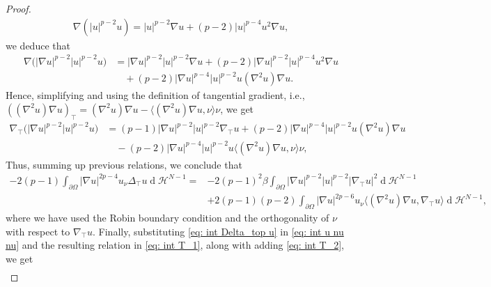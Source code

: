 \documentclass[10pt,a4paper]{amsart}
\numberwithin{equation}{section}
\renewcommand{\d}[1]{\ensuremath{\operatorname{d}\!{#1}}}
\begin{document}
\begin{proof}
\begin{equation*}
\begin{split}
        \nabla (|u|^{p-2} u) = |u|^{p-2} \nabla u + (p-2) |u|^{p-4} u^2 \nabla u,
    \end{split}
    \end{equation*}
    we deduce that
    \begin{equation*}
    \begin{split}
        \nabla \Big(|\nabla u|^{p-2} |u|^{p-2} u \Big) &= |\nabla u|^{p-2} |u|^{p-2} \nabla u + (p-2) |\nabla u|^{p-2} |u|^{p-4} u^2 \nabla u 
        \\
        &\quad+ (p-2) |\nabla u|^{p-4} |u|^{p-2} u (\nabla^2 u) \nabla u.
    \end{split}
    \end{equation*}
    Hence, simplifying and using the definition of tangential gradient, i.e., $((\nabla^2 u) \nabla u)_\top = (\nabla^2 u) \nabla u - \langle(\nabla^2 u) \nabla u,\nu\rangle \nu$, we get 
    \begin{equation*}
    \begin{split}
        \nabla_\top \Big(|\nabla u|^{p-2} |u|^{p-2} u \Big) &= (p-1) |\nabla u|^{p-2} |u|^{p-2} \nabla_\top u 
         + (p-2) |\nabla u|^{p-4} |u|^{p-2} u (\nabla^2 u) \nabla u 
         \\
        &\quad
         - (p-2) |\nabla u|^{p-4} |u|^{p-2} u \langle(\nabla^2 u) \nabla u,\nu\rangle \nu,
    \end{split}
    \end{equation*}
    Thus, summing up previous relations, we conclude that 
    \begin{equation}\label{eq: int Delta_top u}
        \begin{aligned}
        -2(p-1) \int_{\partial\Omega}|\nabla u|^{2p-4} u_\nu \Delta_\top u \d{}\mathcal{H}^{N-1} =
        &-2(p-1)^2\beta\int_{\partial\Omega}|\nabla u|^{p-2}|u|^{p-2}|\nabla_\top u|^2\d{}\mathcal{H}^{N-1}\\
        &+2(p-1)(p-2)\int_{\partial\Omega}|\nabla u|^{2p-6} u_\nu \langle(\nabla^2u)\nabla u,\nabla_\top u\rangle\d{}\mathcal{H}^{N-1},
        \end{aligned}
    \end{equation}
    where we have used the Robin boundary condition and the orthogonality of $\nu$ with respect to $\nabla_\top u$.
    Finally, substituting \eqref{eq: int Delta_top u} in \eqref{eq: int u nu nu} and the resulting relation in \eqref{eq: int T_1}, along with adding \eqref{eq: int T_2}, we get
    \begin{equation*}
        \begin{aligned}

\end{aligned}
\end{equation*}
\end{proof}
\end{document}
